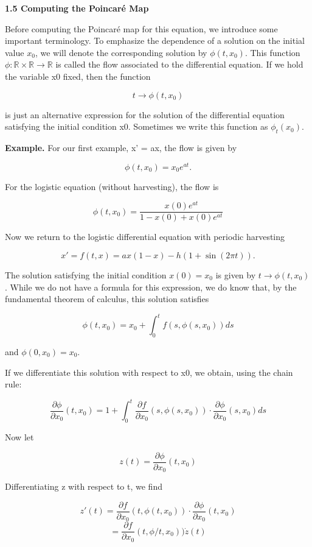 \documentclass[12pt]{article}
\begin{document}
\textbf{1.5 Computing the Poincaré Map}

\hfill

Before computing the Poincaré map for this equation, we introduce some
important terminology. To emphasize the dependence of a solution on the
initial value $x_0$, we will denote the corresponding solution by $\phi(t,x_0)$. This
function $\phi: \mathbb{R} \times \mathbb{R} \to \mathbb{R}$ is called the flow associated to the differential
equation. If we hold the variable x0 fixed, then the function

\[
t \to \phi(t, x_0)
\]

is just an alternative expression for the solution of the differential equation
satisfying the initial condition x0. Sometimes we write this function as $\phi_t(x_0)$.

\hfill

\textbf{Example.} For our first example, x' = ax, the flow is given by

\[
\phi(t , x_0) = x_0e^{at}.
\]

For the logistic equation (without harvesting), the flow is

\[
\phi(t, x_0) = \frac{x(0)e^{at}}{1 - x(0) + x(0)e^{at}}
\]

Now we return to the logistic differential equation with periodic harvesting

\[
x' = f (t, x) = ax(1 - x) - h(1 + \sin(2 \pi t )).
\]


The solution satisfying the initial condition $x(0) = x_0$ is given by $t \to \phi(t, x_0)$.
While we do not have a formula for this expression, we do know that, by the
fundamental theorem of calculus, this solution satisfies

\[
\phi(t, x_0) = x_0 + \int_0^t f(s, \phi(s, x_0)) ds
\]

and $\phi(0, x_0) = x_0$.

If we differentiate this solution with respect to x0, we obtain, using the chain
rule:

\[
\frac{\partial \phi}{\partial x_0}(t, x_0) = 1 + \int_0^t \frac{\partial f}{\partial x_0} (s, \phi(s, x_0)) \cdot \frac{\partial \phi}{\partial x_0} (s, x_0) ds
\]

Now let

\[
z(t) =  \frac{\partial \phi}{\partial x_0}(t, x_0)
\]

Differentiating z with respect to t, we find

\[
z'(t ) = \frac{\partial f}{\partial x_0}(t, \phi(t, x_0)) \cdot \frac{\partial \phi}{\partial x_0}(t, x_0)
\]
\[
= \frac{\partial f}{\partial x_0} (t, \phi/t, x_0)) \dot z(t)
\]
\end{document}
